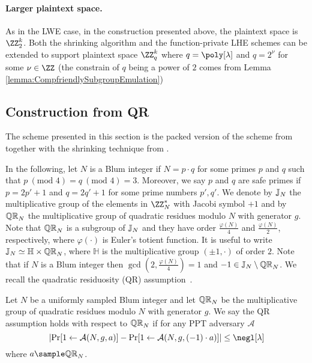 \paragraph{Larger plaintext space.} As in the LWE case, in the construction presented above, the plaintext space is $\ZZ_2^k$. Both the shrinking algorithm and the function-private LHE schemes can be extended to support plaintext space $\ZZ_q^k$ where $q=\poly[\lambda]$ and $q=2^\nu$ for some $\nu\in\ZZ$ (the constrain of $q$ being a power of $2$ comes from Lemma \ref{lemma:CompfriendlySubgroupEmulation})





\subsection{Construction from QR}

The scheme presented in this section is the packed version of the scheme from \cite{C:BraGol10} together with the shrinking technique from \cite{C:DGIMMO19}. 


In the following, let $N$ is a Blum integer if $N = p \cdot q$ for some primes $p$ and $q$ such that $p ~(\text{mod } 4) = q ~(\text{mod } 4) = 3$. Moreover, we say $p$ and $q$ are safe primes if $p=2p'+1$ and $q=2q'+1$ for some prime numbers $p',q'$. We denote by $\mathbb{J}_N$ the multiplicative group of the elements in $\ZZ_N^*$ with Jacobi symbol $+1$ and by $\mathbb{QR}_N$ the multiplicative group of quadratic residues modulo $N$ with generator $g$. Note that $\mathbb{QR}_N$ is a subgroup of $\mathbb{J}_N$ and they have order $\frac{\varphi(N)}{4}$ and $\frac{\varphi(N)}{2}$, respectively, where $\varphi(\cdot)$ is Euler's totient function. It is useful to write $\mathbb{J}_N \simeq \mathbb{H} \times \mathbb{QR}_N$, where $\mathbb{H}$ is the multiplicative group $(\pm 1, \cdot)$ of order $2$. Note that if $N$ is a Blum integer then $\gcd\left(2, \frac{\varphi(N)}{4}\right) = 1$ and $-1 \in \mathbb{J}_N \setminus \mathbb{QR}_N$. We recall the quadratic residuosity (QR) assumption~\cite{STOC:GolMic82}.

\begin{definition}
 Let $N$ be a uniformly sampled Blum integer and let $\mathbb{QR}_N$ be the multiplicative group of quadratic residues modulo $N$ with generator $g$. We say the QR assumption holds with respect to $\mathbb{QR}_N$ if for any PPT adversary $\mathcal{A}$ %
\[\left|\Pr[1\leftarrow\mathcal{A}(N, g, a) ] - \Pr[1\leftarrow\mathcal{A}(N, g, (-1)\cdot a)]\right| \leq \negl[\lambda]\] where $a \sample \QR_N$.
\end{definition}



